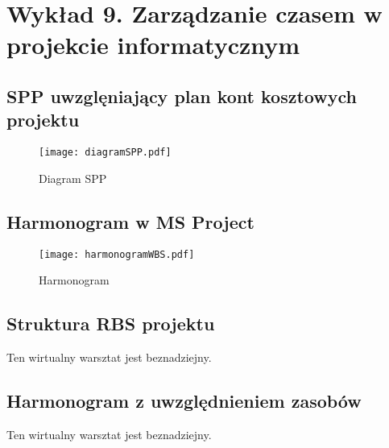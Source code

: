 ﻿\chapter{Wykład 9. Zarządzanie czasem w projekcie informatycznym}

\section{SPP uwzglęniający plan kont kosztowych projektu}

\begin{figure}[hbt]
\centering
\texttt{[image: diagramSPP.pdf]}
\caption{Diagram SPP}
\label{fig:diagramSPP}
\end{figure}


\section{Harmonogram w MS Project}

\begin{figure}[hbt]
\centering
\texttt{[image: harmonogramWBS.pdf]}
\caption{Harmonogram}
\label{fig:harmonogramWBS}
\end{figure}


\section{Struktura RBS projektu}

Ten wirtualny warsztat jest beznadziejny.


\section{Harmonogram z uwzględnieniem zasobów}

Ten wirtualny warsztat jest beznadziejny.


